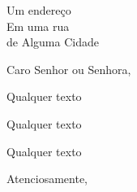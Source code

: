 \documentclass{letter}
\begin{document}
\begin{letter}{Um endereço\\Em uma rua\\de Alguma Cidade}

\opening{Caro Senhor ou Senhora,}

Qualquer texto

Qualquer texto

Qualquer texto

\closing{Atenciosamente,}
    
\end{letter}
\end{document}
